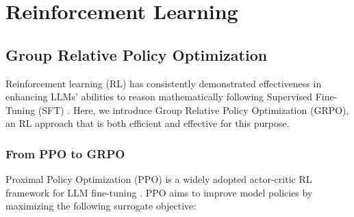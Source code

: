 \section{Reinforcement Learning}

\subsection{Group Relative Policy Optimization}
Reinforcement learning (RL) has consistently demonstrated effectiveness in enhancing LLMs’ abilities to reason mathematically following Supervised Fine-Tuning (SFT) \citep{wang2023math,wizardmath}. Here, we introduce Group Relative Policy Optimization (GRPO), an RL approach that is both efficient and effective for this purpose.

\subsubsection{From PPO to GRPO}
Proximal Policy Optimization (PPO) \citep{schulman2017proximal} is a widely adopted actor-critic RL framework for LLM fine-tuning \citep{ouyang2022training}. PPO aims to improve model policies by maximizing the following surrogate objective:


